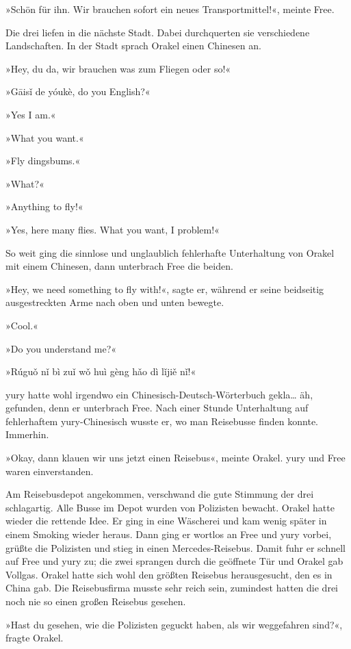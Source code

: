 »Schön für ihn. Wir brauchen sofort ein neues Transportmittel!«, meinte Free.

Die drei liefen in die nächste Stadt. Dabei durchquerten sie verschiedene Landschaften. In der Stadt sprach Orakel einen Chinesen an.

»Hey, du da, wir brauchen was zum Fliegen oder so!«

»Gāisǐ de yóukè, do you English?« %

»Yes I am.«

»What you want.«

»Fly dingsbums.«

»What?«

»Anything to fly!«

»Yes, here many flies. What you want, I problem!«

So weit ging die sinnlose und unglaublich fehlerhafte Unterhaltung von Orakel mit einem Chinesen, dann unterbrach Free die beiden.

»Hey, we need something to fly with!«, sagte er, während er seine beidseitig ausgestreckten Arme nach oben und unten bewegte.

»Cool.«

»Do you understand me?«

»Rúguǒ nǐ bì zuǐ wǒ huì gèng hǎo dì lǐjiě nǐ!« %

yury hatte wohl irgendwo ein Chinesisch-Deutsch-Wörterbuch gekla… äh, gefunden, denn er unterbrach Free. Nach einer Stunde Unterhaltung auf fehlerhaftem yury-Chinesisch wusste er, wo man Reisebusse finden konnte. Immerhin.

»Okay, dann klauen wir uns jetzt einen Reisebus«, meinte Orakel. yury und Free waren einverstanden.

Am Reisebusdepot angekommen, verschwand die gute Stimmung der drei schlagartig. Alle Busse im Depot wurden von Polizisten bewacht. Orakel hatte wieder die rettende Idee. Er ging in eine Wäscherei und kam wenig später in einem Smoking wieder heraus. Dann ging er wortlos an Free und yury vorbei, grüßte die Polizisten und stieg in einen Mercedes-Reisebus. Damit fuhr er schnell auf Free und yury zu; die zwei sprangen durch die geöffnete Tür und Orakel gab Vollgas. Orakel hatte sich wohl den größten Reisebus herausgesucht, den es in China gab. Die Reisebusfirma musste sehr reich sein, zumindest hatten die drei noch nie so einen großen Reisebus gesehen.

»Hast du gesehen, wie die Polizisten geguckt haben, als wir weggefahren sind?«, fragte Orakel.

